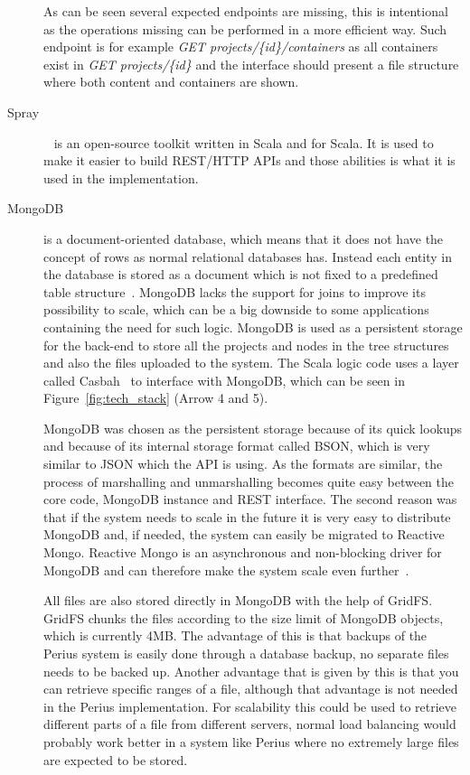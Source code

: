 \documentclass[a4paper,12pt]{article}
\begin{document}
\begin{description}
As can be seen several expected endpoints are missing, this is intentional as the operations missing
can be performed in a more efficient way. Such endpoint is for example \textit{GET 
projects/\{id\}/containers} as all containers exist in \textit{GET projects/\{id\}} and the interface
should present a file structure where both content and containers are shown.

\item[Spray]~\cite{CASBAH} %
is an open-source toolkit written in Scala and for Scala. It is used to make it easier to build
REST/HTTP APIs and those abilities is what it is used in the implementation.

\item[MongoDB]%
is a document-oriented database, which means that it does not have the concept of rows as
normal relational databases has. Instead each entity in the database is stored as a document which
is not fixed to a predefined table structure~\cite{MONGODB}. MongoDB lacks the support for joins to
improve its possibility to scale, which can be a big downside to some applications containing the
need for such logic. MongoDB is used as a persistent storage for the back-end to store all the
projects and nodes in the tree structures and also the files uploaded to the system. The Scala logic
code uses a layer called Casbah~\cite{CASBAH} to interface with MongoDB, which can be seen in
Figure~\ref{fig:tech_stack} (Arrow 4 and 5).

\par MongoDB was chosen as the persistent storage because of its quick lookups and because of its
internal storage format called BSON, which is very similar to JSON which the API is using. As the
formats are similar, the process of marshalling and unmarshalling becomes quite easy between the
core code, MongoDB instance and REST interface.  The second reason was that if the system needs to
scale in the future it is very easy to distribute MongoDB and, if needed, the system can easily be
migrated to Reactive Mongo. Reactive Mongo is an asynchronous and non-blocking driver for MongoDB
and can therefore make the system scale even further~\cite{REACTIVEMONGO}.

\par All files are also stored directly in MongoDB with the help of GridFS. GridFS chunks the files 
according to the size limit of MongoDB objects, which is currently 4MB. The advantage of this is 
that backups of the Perius system is easily done through a database backup, no separate files 
needs to be backed up. Another advantage that is given by this is that you can retrieve specific 
ranges of a file, although that advantage is not needed in the Perius implementation. For
scalability this could be used to retrieve different parts of a file from different servers, 
normal load balancing would probably work better in a system like Perius where no extremely large 
files are expected to be stored. 


\end{description}
\end{document}
